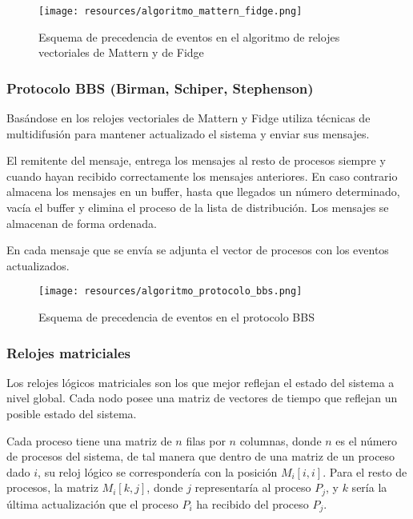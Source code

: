 \documentclass[a4paper, 11pt, titlepage]{article}
\begin{document}
            \begin{figure}[htp]
                \centering
                \texttt{[image: resources/algoritmo\_mattern\_fidge.png]}
                \caption{Esquema de precedencia de eventos en el algoritmo de relojes vectoriales de Mattern 
                y de Fidge}
                \label{algoritmo_mattern_fidge}
            \end{figure}


        \subsubsection{Protocolo BBS (Birman, Schiper, Stephenson)}

            Basándose en los relojes vectoriales de Mattern y Fidge utiliza técnicas de multidifusión para 
            mantener actualizado el sistema y enviar sus mensajes.

            El remitente del mensaje, entrega los mensajes al resto de procesos siempre y cuando hayan 
            recibido correctamente los mensajes anteriores. En caso contrario almacena los mensajes en 
            un buffer, hasta que llegados un número determinado, vacía el buffer y elimina el proceso de 
            la lista de distribución. Los mensajes se almacenan de forma ordenada.
            
            En cada mensaje que se envía se adjunta el vector de procesos con los eventos actualizados.

            \begin{figure}[htp]
                \centering
                \texttt{[image: resources/algoritmo\_protocolo\_bbs.png]}
                \caption{Esquema de precedencia de eventos en el protocolo BBS}
                \label{algoritmo_protocolo_bbs}
            \end{figure}

        \subsubsection{Relojes matriciales}

            Los relojes lógicos matriciales son los que mejor reflejan el estado del sistema a nivel 
            global. Cada nodo posee una matriz de vectores de tiempo que reflejan un posible estado 
            del sistema.

            Cada proceso tiene una matriz de $n$ filas por $n$ columnas, donde $n$ es el número de 
            procesos del sistema, de tal manera que dentro de una matriz de un proceso dado $i$, su 
            reloj lógico se correspondería con la posición $M_i[i,i]$. Para el resto de procesos, 
            la matriz $M_i[k, j]$, donde $j$ representaría al proceso $P_j$, y $k$ sería la última 
            actualización que el proceso $P_i$ ha recibido del proceso $P_j$.
\end{document}
